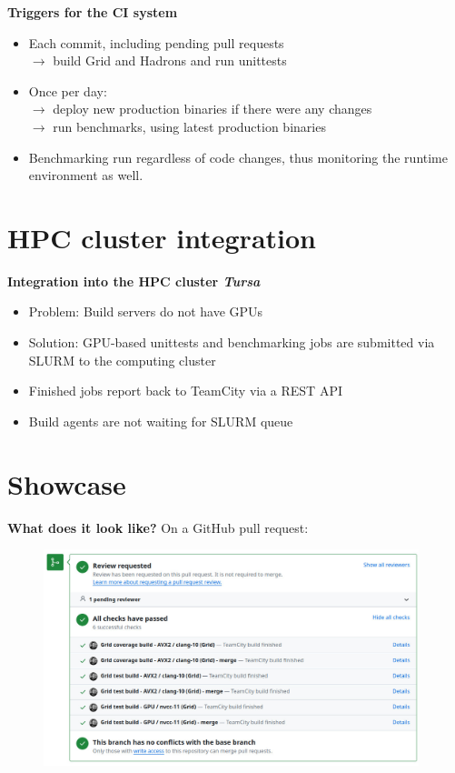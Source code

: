 \documentclass[english,11pt]{beamer}
\begin{document}
\begin{frame}
 \textbf{Triggers for the CI system}
\begin{itemize}
 \item Each commit, including pending pull requests \\$\longrightarrow$ build Grid and Hadrons and run unittests
 \item Once per day: \\$\longrightarrow$ deploy new production binaries if there were any changes \\
 $\longrightarrow$ run benchmarks, using latest production binaries
 \item Benchmarking run regardless of code changes, thus monitoring the runtime environment as well.
\end{itemize}

\end{frame}




\section{HPC cluster integration}
\begin{frame}
 \textbf{Integration into the HPC cluster \emph{Tursa}}
 \begin{itemize}
  \item Problem: Build servers do not have GPUs
  \item Solution: GPU-based unittests and benchmarking jobs are submitted via SLURM to the computing cluster
  \item Finished jobs report back to TeamCity via a REST API
  \item Build agents are not waiting for SLURM queue
 \end{itemize}

\end{frame}

\section{Showcase}
\begin{frame}
 \textbf{What does it look like?}
 On a GitHub pull request:
  \begin{figure}[H]
	\centering
    {\includegraphics[width=4.3in]{diagrams/pr.jpg}}
\end{figure}
\end{frame}
\end{document}
